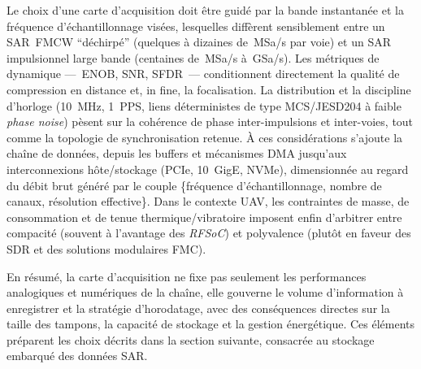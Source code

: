 Le choix d’une carte d’acquisition doit être guidé par la bande instantanée et la fréquence d’échantillonnage visées, lesquelles diffèrent sensiblement entre un SAR~FMCW “déchirpé” (quelques à dizaines de~MSa/s par voie) et un SAR impulsionnel large bande (centaines de~MSa/s à~GSa/s). Les métriques de dynamique —~ENOB, SNR, SFDR~— conditionnent directement la qualité de compression en distance et, in fine, la focalisation. La distribution et la discipline d’horloge (10~MHz, 1~PPS, liens déterministes de type MCS/JESD204 à faible \textit{phase noise}) pèsent sur la cohérence de phase inter-impulsions et inter-voies, tout comme la topologie de synchronisation retenue. À ces considérations s’ajoute la chaîne de données, depuis les buffers et mécanismes DMA jusqu’aux interconnexions hôte/stockage (PCIe, 10~GigE, NVMe), dimensionnée au regard du débit brut généré par le couple \{fréquence d’échantillonnage, nombre de canaux, résolution effective\}. Dans le contexte UAV, les contraintes de masse, de consommation et de tenue thermique/vibratoire imposent enfin d’arbitrer entre compacité (souvent à l’avantage des \textit{RFSoC}) et polyvalence (plutôt en faveur des SDR et des solutions modulaires FMC).

En résumé, la carte d’acquisition ne fixe pas seulement les performances analogiques et numériques de la chaîne, elle gouverne le volume d’information à enregistrer et la stratégie d’horodatage, avec des conséquences directes sur la taille des tampons, la capacité de stockage et la gestion énergétique. Ces éléments préparent les choix décrits dans la section suivante, consacrée au stockage embarqué des données SAR.

